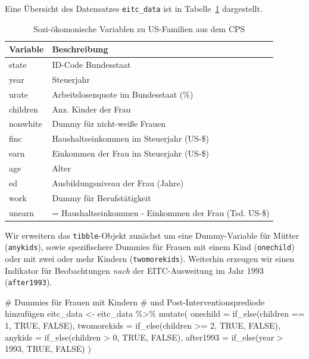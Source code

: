 \documentclass[
  a4paper,
  DIV=11,
  oneside]{scrreprt}
\newenvironment{Shaded}{\begin{snugshade}}{\end{snugshade}}
\newcommand{\AttributeTok}[1]{\textcolor[rgb]{0.40,0.45,0.13}{#1}}
\newcommand{\CommentTok}[1]{\textcolor[rgb]{0.37,0.37,0.37}{#1}}
\newcommand{\ConstantTok}[1]{\textcolor[rgb]{0.56,0.35,0.01}{#1}}
\newcommand{\DecValTok}[1]{\textcolor[rgb]{0.68,0.00,0.00}{#1}}
\newcommand{\FunctionTok}[1]{\textcolor[rgb]{0.28,0.35,0.67}{#1}}
\newcommand{\NormalTok}[1]{\textcolor[rgb]{0.00,0.23,0.31}{#1}}
\newcommand{\OtherTok}[1]{\textcolor[rgb]{0.00,0.23,0.31}{#1}}
\newcommand{\SpecialCharTok}[1]{\textcolor[rgb]{0.37,0.37,0.37}{#1}}
\begin{document}
Eine Übersicht des Datensatzes \texttt{eitc\_data} ist in
Tabelle~\ref{tbl-EITCdata} dargestellt.

\begin{longtable}{ll}

\caption{\label{tbl-EITCdata}Sozi-ökomonische Variablen zu US-Familien
aus dem CPS}

\tabularnewline

\toprule
Variable & Beschreibung \\ 
\midrule\addlinespace[2.5pt]
state & ID-Code Bundesstaat \\ 
year & Steuerjahr \\ 
urate & Arbeitslosenquote im Bundesstaat (\%) \\ 
children & Anz. Kinder der Frau \\ 
nonwhite & Dummy für nicht-weiße Frauen \\ 
finc & Haushaltseinkommen im Steuerjahr (US-\$) \\ 
earn & Einkommen der Frau im Steuerjahr (US-\$) \\ 
age & Alter \\ 
ed & Ausbildungsniveau der Frau (Jahre) \\ 
work & Dummy für Berufstätigkeit \\ 
unearn & = Haushaltseinkommen - Einkommen der Frau (Tsd. US-\$)  \\ 
\bottomrule

\end{longtable}

Wir erweitern das \texttt{tibble}-Objekt zunächst um eine Dummy-Variable
für Mütter (\texttt{anykids}), sowie spezifischere Dummies für Frauen
mit einem Kind (\texttt{onechild}) oder mit zwei oder mehr Kindern
(\texttt{twomorekids}). Weiterhin erzeugen wir einen Indikator für
Beobachtungen \emph{nach} der EITC-Ausweitung im Jahr 1993
(\texttt{after1993}).

\begin{Shaded}
\begin{Highlighting}[]
\CommentTok{\# Dummies für Frauen mit Kindern}
\CommentTok{\# und Post{-}Interventionsprediode hinzufügen }
\NormalTok{eitc\_data }\OtherTok{\textless{}{-}}\NormalTok{ eitc\_data }\SpecialCharTok{\%\textgreater{}\%}
  \FunctionTok{mutate}\NormalTok{(}
    \AttributeTok{onechild =} \FunctionTok{if\_else}\NormalTok{(children }\SpecialCharTok{==} \DecValTok{1}\NormalTok{, }\ConstantTok{TRUE}\NormalTok{, }\ConstantTok{FALSE}\NormalTok{),}
    \AttributeTok{twomorekids =} \FunctionTok{if\_else}\NormalTok{(children }\SpecialCharTok{\textgreater{}=} \DecValTok{2}\NormalTok{, }\ConstantTok{TRUE}\NormalTok{, }\ConstantTok{FALSE}\NormalTok{),}
    \AttributeTok{anykids =} \FunctionTok{if\_else}\NormalTok{(children }\SpecialCharTok{\textgreater{}} \DecValTok{0}\NormalTok{, }\ConstantTok{TRUE}\NormalTok{, }\ConstantTok{FALSE}\NormalTok{),}
    \AttributeTok{after1993 =} \FunctionTok{if\_else}\NormalTok{(year }\SpecialCharTok{\textgreater{}} \DecValTok{1993}\NormalTok{, }\ConstantTok{TRUE}\NormalTok{, }\ConstantTok{FALSE}\NormalTok{)}
\NormalTok{  )}
\end{Highlighting}
\end{Shaded}
\end{document}
